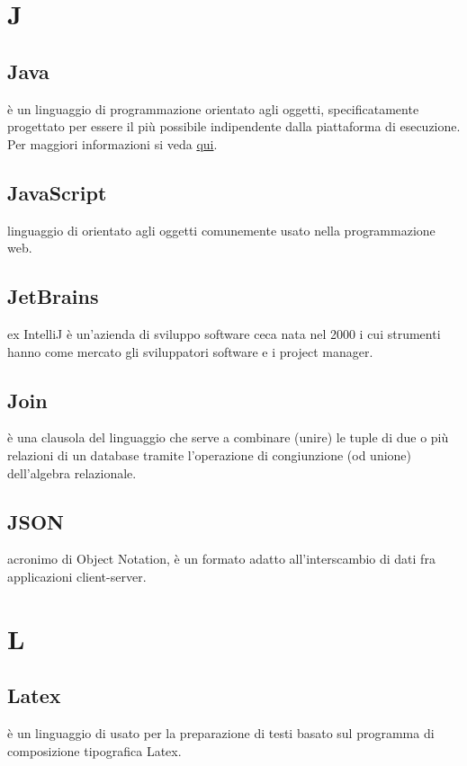\documentclass[12pt,a4paper]{article}
\begin{document}
\newpage

\section{J}


\subsection{Java} 
 è un linguaggio di programmazione orientato agli oggetti, specificatamente progettato per essere il più possibile indipendente dalla piattaforma di esecuzione. Per maggiori informazioni si veda \href{https://it.wikipedia.org/wiki/Java_(linguaggio_di_programmazione)}{qui}.

\subsection{JavaScript} 
 linguaggio di  orientato agli oggetti comunemente usato nella programmazione web.
 
 \subsection{JetBrains}
ex IntelliJ è un'azienda di sviluppo software ceca nata nel 2000 i cui strumenti hanno come mercato gli sviluppatori software e i project manager.

\subsection{Join} 
 è una clausola del linguaggio  che serve a combinare (unire) le tuple di due o più relazioni di un database tramite l'operazione di congiunzione (od unione) dell'algebra relazionale.

\subsection{JSON} 
 acronimo di  Object Notation, è un formato adatto all'interscambio di dati fra applicazioni client-server.


\newpage

\section{L}


\subsection{Latex} 
 è un linguaggio di  usato per la preparazione di testi basato sul programma di composizione tipografica Latex.
\end{document}
